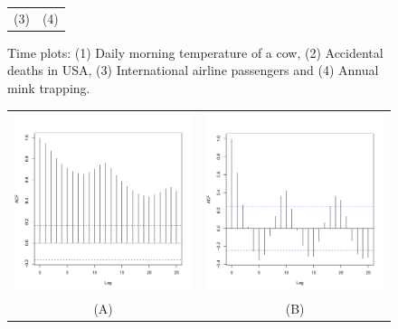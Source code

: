 \documentclass[a4paper,11pt,oneside,onecolumn]{book}
\begin{document}
\begin{figure}[!h]
\begin{tabular}{cc}
(3) & (4)\\
\end{tabular}
\caption{Time plots: (1) Daily morning temperature of a cow, (2) Accidental deaths in USA, (3) International airline passengers and (4)  Annual mink trapping.} \label{fig:ex:plots}
\end{figure}

\begin{figure}[!h]
\begin{tabular}{cc}
\includegraphics[width=.5\linewidth]{ airpassACF}&\includegraphics[width=.5\linewidth]{ minkACF}\\
(A)&(B)\\

\end{tabular}
\end{figure}
\end{document}

